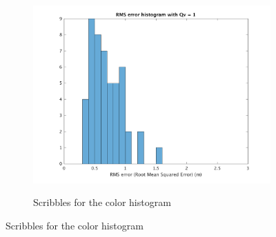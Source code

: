 \documentclass[paper=a4, margin=10mm, fontsize=11pt]{scrartcl} %
\numberwithin{equation}{section} %
\numberwithin{figure}{section} %
\numberwithin{table}{section} %
\begin{document}
\begin{figure}[H]
\begin{subfigure}[b]{0.3\textwidth}
{		  \includegraphics[width=\textwidth]{hist3.png}
		}
	\caption{Scribbles for the color histogram \label{fig:vadenoised}}
	\end{subfigure}
\end{figure}
\end{document}
